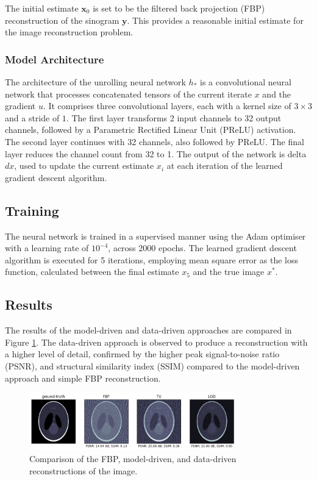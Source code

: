\documentclass[11pt]{article}
\begin{document}
The initial estimate \( \mathbf{x}_0 \) is set to be the filtered back projection (FBP) reconstruction of the sinogram \( \mathbf{y} \). This provides a reasonable initial estimate for the image reconstruction problem.

\subsubsection{Model Architecture}
The architecture of the unrolling neural network \( h_* \) is a convolutional neural network that processes concatenated tensors of the current iterate $x$ and the gradient $u$. It comprises three convolutional layers, each with a kernel size of $3 \times 3$ and a stride of $1$. The first layer transforms 2 input channels to 32 output channels, followed by a Parametric Rectified Linear Unit (PReLU) activation. The second layer continues with 32 channels, also followed by PReLU. The final layer reduces the channel count from 32 to 1. The output of the network is delta $dx$, used to update the current estimate $x_i$ at each iteration of the learned gradient descent algorithm.

\subsection{Training}
The neural network is trained in a supervised manner using the Adam optimiser with a learning rate of $10^{-4}$, across 2000 epochs. The learned gradient descent algorithm is executed for 5 iterations, employing mean square error as the loss function, calculated between the final estimate $x_5$ and the true image $x^*$.

\subsection{Results}
The results of the model-driven and data-driven approaches are compared in Figure \ref{fig:reconstruction_comparison}. The data-driven approach is observed to produce a reconstruction with a higher level of detail, confirmed by the higher peak signal-to-noise ratio (PSNR), and structural similarity index (SSIM) compared to the model-driven approach and simple FBP reconstruction. 

\begin{figure}[H]
    \centering
    \includegraphics[width=0.8\textwidth]{figs/q3_2_results.png}
    \caption{Comparison of the FBP, model-driven, and data-driven reconstructions of the image.}
    \label{fig:reconstruction_comparison}
\end{figure}

\end{document}
